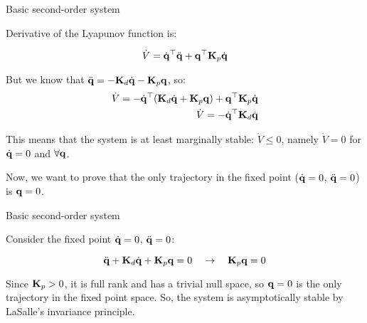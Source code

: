 \documentclass{beamer}
\begin{document}
\begin{frame}{Basic second-order system}
	\begin{flushleft}
		
		Derivative of the Lyapunov function is:
		
		\begin{equation}
			\dot V = \dot{\mathbf{q}}^\top  \ddot{\mathbf{q}} + 
			\mathbf{q}^\top \mathbf{K}_p \dot{\mathbf{q}}
		\end{equation}
		
		But we know that $\ddot{\mathbf{q}} = -\mathbf{K}_d \dot{\mathbf{q}} - \mathbf{K}_p\mathbf{q}$, so:
		\begin{align}
	\dot V = -\dot{\mathbf{q}}^\top  (\mathbf{K}_d \dot{\mathbf{q}} + \mathbf{K}_p\mathbf{q}) + 
	\mathbf{q}^\top \mathbf{K}_p \dot{\mathbf{q}} 
	\\
	\dot V = -\dot{\mathbf{q}}^\top\mathbf{K}_d \dot{\mathbf{q}} 
		\end{align}		
	
	This means that the system is at least marginally stable: $\dot V \leq 0$, namely $\dot V = 0$ for $\dot{\mathbf{q}} = 0$ and $\forall \mathbf{q}$.
		
		\bigskip
		
		Now, we want to prove that the only trajectory in the fixed point ($\dot{\mathbf{q}} = 0$, $\ddot{\mathbf{q}} = 0$) is $\mathbf{q} = 0$.
		
	\end{flushleft}
\end{frame}




\begin{frame}{Basic second-order system}
	\begin{flushleft}
		
		Consider the fixed point $\dot{\mathbf{q}} = 0$, $\ddot{\mathbf{q}} = 0$:
		
		\begin{equation}
			\ddot{\bo{q}} + \bo{K}_d \dot{\bo{q}} + \bo{K}_p\bo{q} = 0 
			\ \ \ \rightarrow \ \ \ 
			\bo{K}_p\bo{q} = 0
		\end{equation}
		
		Since $\mathbf{K}_p > 0$, it is full rank and has a trivial null space, so $\mathbf{q} = 0 $ is the only trajectory in the fixed point space. So, the system is asymptotically stable by LaSalle's invariance principle.
		
	\end{flushleft}
\end{frame}
\end{document}
